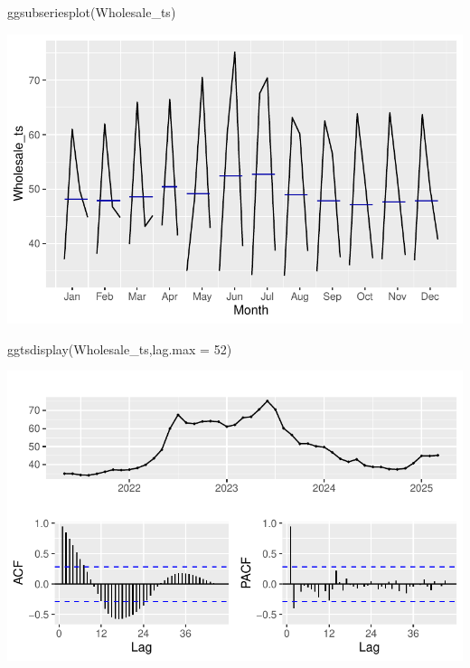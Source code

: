 \documentclass[
  letterpaper,
  DIV=11,
  numbers=noendperiod]{scrartcl}
\newenvironment{Shaded}{\begin{snugshade}}{\end{snugshade}}
\newcommand{\AttributeTok}[1]{\textcolor[rgb]{0.40,0.45,0.13}{#1}}
\newcommand{\DecValTok}[1]{\textcolor[rgb]{0.68,0.00,0.00}{#1}}
\newcommand{\FunctionTok}[1]{\textcolor[rgb]{0.28,0.35,0.67}{#1}}
\newcommand{\NormalTok}[1]{\textcolor[rgb]{0.00,0.23,0.31}{#1}}
\begin{document}
\subsubsection{}\label{section}

\begin{Shaded}
\begin{Highlighting}[]
\FunctionTok{ggsubseriesplot}\NormalTok{(Wholesale\_ts)}
\end{Highlighting}
\end{Shaded}

\includegraphics{Maize_analysis_files/figure-pdf/unnamed-chunk-21-1.pdf}

\begin{Shaded}
\begin{Highlighting}[]
\FunctionTok{ggtsdisplay}\NormalTok{(Wholesale\_ts,}\AttributeTok{lag.max =} \DecValTok{52}\NormalTok{)}
\end{Highlighting}
\end{Shaded}

\includegraphics{Maize_analysis_files/figure-pdf/unnamed-chunk-22-1.pdf}
\end{document}
